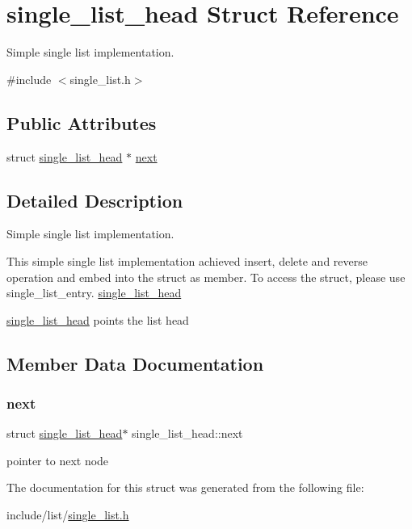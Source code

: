 \hypertarget{structsingle__list__head}{}\section{single\+\_\+list\+\_\+head Struct Reference}
\label{structsingle__list__head}


Simple single list implementation.  




{\ttfamily \#include $<$single\+\_\+list.\+h$>$}

\subsection*{Public Attributes}
\begin{DoxyCompactItemize}
\item 
struct \mbox{\hyperlink{structsingle__list__head}{single\+\_\+list\+\_\+head}} $\ast$ \mbox{\hyperlink{structsingle__list__head_a52974c02f47aea06525d6b91e8d5c86c}{next}}
\end{DoxyCompactItemize}


\subsection{Detailed Description}
Simple single list implementation. 

This simple single list implementation achieved insert, delete and reverse operation and embed into the struct as member. To access the struct, please use single\+\_\+list\+\_\+entry. \mbox{\hyperlink{structsingle__list__head}{single\+\_\+list\+\_\+head}}

\mbox{\hyperlink{structsingle__list__head}{single\+\_\+list\+\_\+head}} points the list head 

\subsection{Member Data Documentation}
\mbox{\label{structsingle__list__head_a52974c02f47aea06525d6b91e8d5c86c}} 
\subsubsection{\texorpdfstring{next}{next}}
{\footnotesize\ttfamily struct \mbox{\hyperlink{structsingle__list__head}{single\+\_\+list\+\_\+head}}$\ast$ single\+\_\+list\+\_\+head\+::next}

pointer to next node 

The documentation for this struct was generated from the following file\+:\begin{DoxyCompactItemize}
\item 
include/list/\mbox{\hyperlink{single__list_8h}{single\+\_\+list.\+h}}\end{DoxyCompactItemize}
